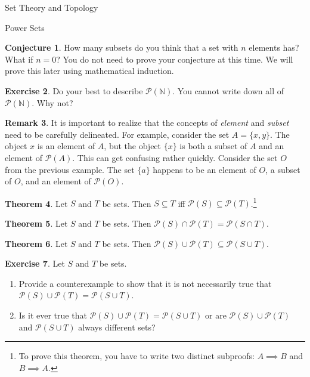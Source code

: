 \documentclass[11pt]{article}
\theoremstyle{definition}
\newtheorem{theorem}{Theorem}[section]
\newtheorem{conjecture}[theorem]{Conjecture}
\newtheorem{exercise}[theorem]{Exercise}
\newtheorem{remark}[theorem]{Remark}
\begin{document}
\begin{section}{Set Theory and Topology}
\begin{subsection}{Power Sets}
\begin{conjecture}
How many subsets do you think that a set with $n$ elements has?  What if $n=0$?  You do not need to prove your conjecture at this time.  We will prove this later using mathematical induction.
\end{conjecture}

\begin{exercise}
Do your best to describe $\mathcal{P}(\mathbb{N})$.  You cannot write down all of $\mathcal{P}(\mathbb{N})$.  Why not?
\end{exercise}

\begin{remark}
It is important to realize that the concepts of \emph{element} and \emph{subset} need to be carefully delineated.  For example, consider the set $A=\{x,y\}$.  The object $x$ is an element of $A$, but the object $\{x\}$ is both a subset of $A$ and an element of $\mathcal{P}(A)$.  This can get confusing rather quickly.  Consider the set $O$ from the previous example.  The set $\{a\}$ happens to be an element of $O$, a subset of $O$, and an element of  $\mathcal{P}(O)$.
\end{remark}

\begin{theorem}
Let $S$ and $T$ be sets.  Then $S\subseteq T$ iff $\mathcal{P}(S)\subseteq \mathcal{P}(T)$.\footnote{To prove this theorem, you have to write two distinct subproofs: $A\implies B$ and $B\implies A$.}
\end{theorem}

\begin{theorem}
Let $S$ and $T$ be sets.  Then $\mathcal{P}(S)\cap\mathcal{P}(T)=\mathcal{P}(S\cap T)$.
\end{theorem}

\begin{theorem}
Let $S$ and $T$ be sets.  Then $\mathcal{P}(S)\cup\mathcal{P}(T)\subseteq \mathcal{P}(S\cup T)$.
\end{theorem}


\begin{exercise}
Let $S$ and $T$ be sets.
\begin{enumerate}
\item Provide a counterexample to show that it is not necessarily true that $\mathcal{P}(S)\cup\mathcal{P}(T)= \mathcal{P}(S\cup T)$.
\item Is it ever true that $\mathcal{P}(S)\cup\mathcal{P}(T)= \mathcal{P}(S\cup T)$ or are $\mathcal{P}(S)\cup\mathcal{P}(T)$ and $\mathcal{P}(S\cup T)$ always different sets?
\end{enumerate}
\end{exercise}


\end{subsection}
\end{section}
\end{document}
